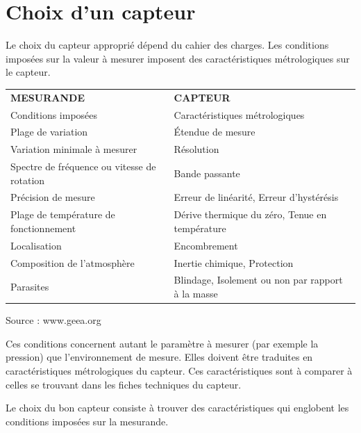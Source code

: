 \documentclass[main.tex]{subfiles}
\begin{document}
\section{Choix d'un capteur}

Le choix du capteur approprié dépend du cahier des charges. Les conditions imposées sur la valeur à mesurer imposent des caractéristiques métrologiques sur le capteur.
\begin {center}
\begin{tabular}{|p{6cm}|p{6cm}|}\hline
    \textbf{MESURANDE}                          & \textbf{CAPTEUR}                                  \\
    Conditions imposées                         & Caractéristiques métrologiques                    \\\hline\hline
    Plage de variation                          & Étendue de mesure                                 \\\hline
    Variation minimale à mesurer                & Résolution                                        \\\hline
    Spectre de fréquence ou vitesse de rotation & Bande passante                                    \\\hline
    Précision de mesure                         & Erreur de linéarité, Erreur d'hystérésis          \\\hline
    Plage de température de fonctionnement      & Dérive thermique du zéro, Tenue en température    \\\hline
    Localisation                                & Encombrement                                      \\\hline
    Composition de l'atmosphère                 & Inertie chimique, Protection                      \\\hline
    Parasites                                   & Blindage, Isolement ou non par rapport à la masse \\\hline
\end{tabular}
\end{center}
Source : www.geea.org

Ces conditions concernent autant le paramètre à mesurer (par exemple la pression) que l'environnement de mesure. Elles doivent être traduites en caractéristiques métrologiques du capteur. Ces caractéristiques sont à comparer à celles se trouvant dans les fiches techniques du capteur.

Le choix du bon capteur consiste à trouver des caractéristiques qui englobent les conditions imposées sur la mesurande.
\end{document}
